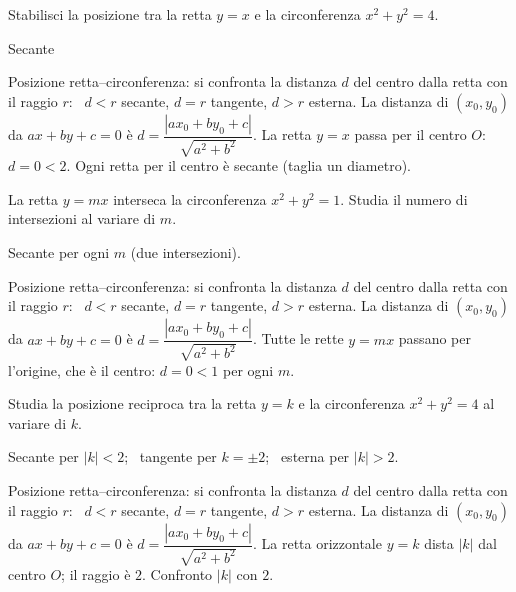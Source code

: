 
\begin{question}[ID=3.3, subtitle={Posizione di $y=x$ rispetto a $x^2+y^2=4$}, difficulty=facile, tags={retta, circonferenza, posizione reciproca}]
Stabilisci la posizione tra la retta $y=x$ e la circonferenza $x^2+y^2=4$.
\begin{solution}
Secante
\end{solution}
\begin{explanation}
Posizione retta–circonferenza: si confronta la distanza $d$ del centro dalla retta con il raggio $r$: \ $d<r$ secante, $d=r$ tangente, $d>r$ esterna. La distanza di $(x_0,y_0)$ da $ax+by+c=0$ è $d=\dfrac{|ax_0+by_0+c|}{\sqrt{a^2+b^2}}$.
La retta $y=x$ passa per il centro $O$: $d=0<2$. Ogni retta per il centro è secante (taglia un diametro).
\end{explanation}
\end{question}


\begin{question}[ID=3.4, subtitle={Intersezioni di $y=mx$ con la circonferenza unitaria al variare di $m$}, difficulty=media, tags={retta, circonferenza, parametrico}]
La retta $y=mx$ interseca la circonferenza $x^2+y^2=1$. Studia il numero di intersezioni al variare di $m$.
\begin{solution}
Secante per ogni $m$ (due intersezioni).
\end{solution}
\begin{explanation}
Posizione retta–circonferenza: si confronta la distanza $d$ del centro dalla retta con il raggio $r$: \ $d<r$ secante, $d=r$ tangente, $d>r$ esterna. La distanza di $(x_0,y_0)$ da $ax+by+c=0$ è $d=\dfrac{|ax_0+by_0+c|}{\sqrt{a^2+b^2}}$.
Tutte le rette $y=mx$ passano per l'origine, che è il centro: $d=0<1$ per ogni $m$.
\end{explanation}
\end{question}


\begin{question}[ID=3.5, subtitle={Posizione di $y=k$ rispetto a $x^2+y^2=4$ al variare di $k$}, difficulty=media, tags={parametrico, retta, circonferenza}]
Studia la posizione reciproca tra la retta $y=k$ e la circonferenza $x^2+y^2=4$ al variare di $k$.
\begin{solution}
Secante per $|k|<2$; \ tangente per $k=\pm2$; \ esterna per $|k|>2$.
\end{solution}
\begin{explanation}
Posizione retta–circonferenza: si confronta la distanza $d$ del centro dalla retta con il raggio $r$: \ $d<r$ secante, $d=r$ tangente, $d>r$ esterna. La distanza di $(x_0,y_0)$ da $ax+by+c=0$ è $d=\dfrac{|ax_0+by_0+c|}{\sqrt{a^2+b^2}}$.
La retta orizzontale $y=k$ dista $|k|$ dal centro $O$; il raggio è $2$. Confronto $|k|$ con $2$.
\end{explanation}
\end{question}

